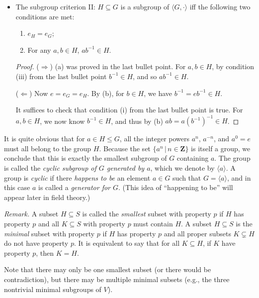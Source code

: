 \documentclass[11pt]{article}
\newcommand{\rmk}{\noindent\textit{Remark. }}
\newcommand{\where}{\,|\,}
\newcommand{\Z}{\mathbf{Z}}
\newcommand{\df}[1]{\textit{\textsf{#1}}}
\newcommand{\la}{\langle}
\newcommand{\ra}{\rangle}
\renewcommand{\implies}{\Rightarrow}
\renewcommand{\impliedby}{\Leftarrow}
\begin{document}
\begin{itemize}
\begin{proof}
        ($\impliedby$) Remember associativity is inherited.
    \end{proof}
    \item The subgroup criterion II: $H \subseteq G$ is a subgroup of $\la G,\cdot \ra$ iff the following two conditions are met:
    \begin{enumerate}[label=(\alph*)]
        \item $e_H = e_G$;
        \item For any $a,b \in H$, $ab^{-1} \in H$.
    \end{enumerate}
    \begin{proof}
        ($\implies$) (a) was proved in the last bullet point. For $a,b \in H$, by condition (iii) from the last bullet point $b^{-1} \in H$, and so $ab^{-1} \in H$.

        ($\impliedby$) Now $e = e_G = e_H$. By (b), for $b \in H$, we have $b^{-1} = eb^{-1} \in H$.
        
        It suffices to check that condition (i) from the last bullet point is true. For $a,b \in H$, we now know $b^{-1} \in H$, and thus by (b) $ab = a(b^{-1})^{-1} \in H$.
    \end{proof}
\end{itemize}
\begin{framed}
    It is quite obvious that for $a \in H \leq G$, all the integer powers $a^n$, $a^{-n}$, and $a^0 = e$ must all belong to the group $H$. Because the set $\{a^n \where n \in \Z\}$ is itself a group, we conclude that this is exactly the smallest subgroup of $G$ containing $a$. The group is called the \df{cyclic subgroup of $G$ generated by $a$}, which we denote by $\la a \ra$. A group is \df{cyclic} if there \emph{happens to be} an element $a \in G$ such that $G = \la a \ra$, and in this case $a$ is called a \df{generator for $G$}. (This idea of ``happening to be'' will appear later in field theory.)
\end{framed}
\rmk A subset $H \subseteq S$ is called the \df{smallest} subset with property $p$ if $H$ has property $p$ and all $K \subseteq S$ with property $p$ must contain $H$. A subset $H \subseteq S$ is the \df{minimal} subset with property $p$ if $H$ has property $p$ and all proper subsets $K \subsetneq H$ do not have property $p$. It is equivalent to say that for all $K \subseteq H$, if $K$ have property $p$, then $K = H$.

Note that there may only be one smallest subset (or there would be contradiction), but there may be multiple minimal subsets (e.g., the three nontrivial minimal subgroups of $V$).
\end{document}

